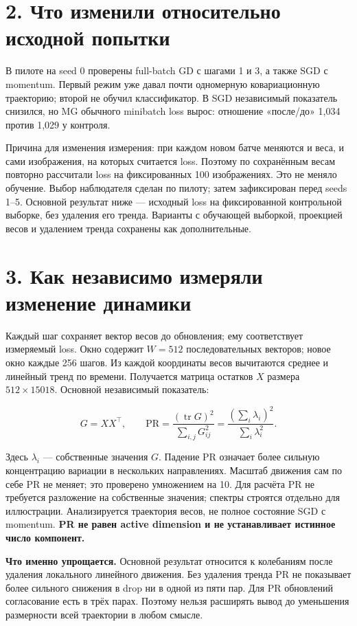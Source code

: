 \documentclass[10pt,a4paper]{article}
\begin{document}
\section*{2. Что изменили относительно исходной попытки}

В пилоте на seed 0 проверены full-batch GD с шагами 1 и 3, а также SGD с momentum. Первый режим уже давал почти одномерную ковариационную траекторию; второй не обучил классификатор. В SGD независимый показатель снизился, но MG обычного minibatch loss вырос: отношение «после/до» 1,034 против 1,029 у контроля.

Причина для изменения измерения: при каждом новом батче меняются и веса, и сами изображения, на которых считается loss. Поэтому по сохранённым весам повторно рассчитали loss на фиксированных 100 изображениях. Это не меняло обучение. Выбор наблюдателя сделан по пилоту; затем зафиксирован перед seeds 1--5. Основной результат ниже --- исходный loss на фиксированной контрольной выборке, без удаления его тренда. Варианты с обучающей выборкой, проекцией весов и удалением тренда сохранены как дополнительные.

\newpage

\section*{3. Как независимо измеряли изменение динамики}

Каждый шаг сохраняет вектор весов до обновления; ему соответствует измеряемый loss. Окно содержит $W=512$ последовательных векторов; новое окно каждые 256 шагов. Из каждой координаты весов вычитаются среднее и линейный тренд по времени. Получается матрица остатков $X$ размера $512\times15018$. Основной независимый показатель:

\[
G=XX^\top,\qquad \mathrm{PR}=\frac{(\operatorname{tr}G)^2}{\sum_{i,j}G_{ij}^2}
=\frac{(\sum_i\lambda_i)^2}{\sum_i\lambda_i^2}.
\]

Здесь $\lambda_i$ --- собственные значения $G$. Падение PR означает более сильную концентрацию вариации в нескольких направлениях. Масштаб движения сам по себе PR не меняет; это проверено умножением на 10. Для расчёта PR не требуется разложение на собственные значения; спектры строятся отдельно для иллюстрации. Анализируется траектория весов, не полное состояние SGD с momentum. \textbf{PR не равен active dimension и не устанавливает истинное число компонент.}

\textbf{Что именно упрощается.} Основной результат относится к колебаниям после удаления локального линейного движения. Без удаления тренда PR не показывает более сильного снижения в drop ни в одной из пяти пар. Для PR обновлений согласование есть в трёх парах. Поэтому нельзя расширять вывод до уменьшения размерности всей траектории в любом смысле.
\end{document}
